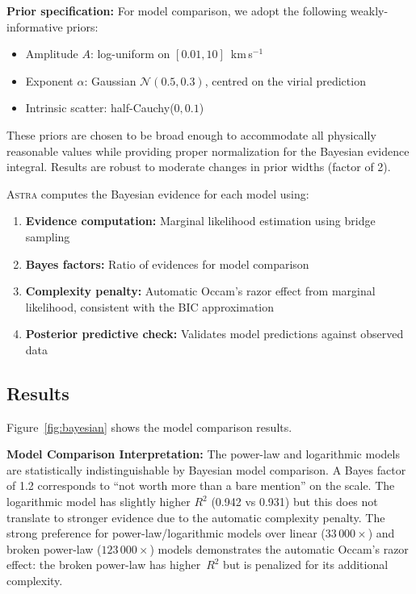 \documentclass[fleqn,usenatbib]{mnras}
\newcommand{\astra}{\textsc{Astra}\xspace}
\begin{document}
\textbf{Prior specification:}
For model comparison, we adopt the following weakly-informative priors:
\begin{itemize}
  \item Amplitude $A$: log-uniform on $[0.01, 10]$~km\,s$^{-1}$
  \item Exponent $\alpha$: Gaussian $\mathcal{N}(0.5, 0.3)$, centred on the virial prediction
  \item Intrinsic scatter: half-Cauchy($0, 0.1$)
\end{itemize}
These priors are chosen to be broad enough to accommodate all physically reasonable values while providing proper normalization for the Bayesian evidence integral.
Results are robust to moderate changes in prior widths (factor of 2).

\astra computes the Bayesian evidence for each model using:
\begin{enumerate}
  \item[(i)] \textbf{Evidence computation:} Marginal likelihood estimation using bridge sampling \citep{MengWong1996}
  \item[(ii)] \textbf{Bayes factors:} Ratio of evidences for model comparison \citep{KassRaftery1995}
  \item[(iii)] \textbf{Complexity penalty:} Automatic Occam's razor effect from marginal likelihood, consistent with the BIC approximation \citep{Schwarz1978}
  \item[(iv)] \textbf{Posterior predictive check:} Validates model predictions against observed data
\end{enumerate}

\subsection{Results}
\label{sec:tc5:results}

Figure~\ref{fig:bayesian} shows the model comparison results.

\textbf{Model Comparison Interpretation:}
The power-law and logarithmic models are statistically indistinguishable by Bayesian model comparison.
A Bayes factor of 1.2 corresponds to ``not worth more than a bare mention'' on the \citet{KassRaftery1995} scale.
The logarithmic model has slightly higher $R^2$ (0.942 vs 0.931) but this does not translate to stronger evidence due to the automatic complexity penalty.
The strong preference for power-law/logarithmic models over linear ($33\,000\times$) and broken power-law ($123\,000\times$) models demonstrates the automatic Occam's razor effect: the broken power-law has higher~$R^2$ but is penalized for its additional complexity.
\end{document}
